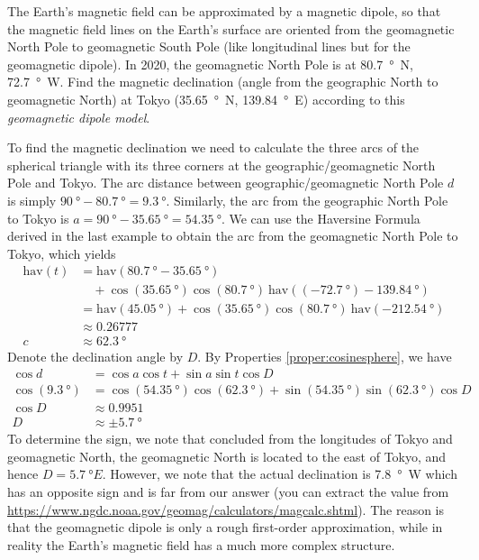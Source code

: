 \begin{exmp}
The Earth's magnetic field can be approximated by a magnetic dipole, so that the magnetic field lines on the Earth's surface are oriented from the geomagnetic North Pole to geomagnetic South Pole (like longitudinal lines but for the geomagnetic dipole). In 2020, the geomagnetic North Pole is at \SI{80.7}{\degree N}, \SI{72.7}{\degree W}. Find the magnetic declination (angle from the geographic North to geomagnetic North) at Tokyo (\SI{35.65}{\degree N}, \SI{139.84}{\degree E}) according to this \textit{geomagnetic dipole model}.
\end{exmp}
\begin{solution}
To find the magnetic declination we need to calculate the three arcs of the spherical triangle with its three corners at the geographic/geomagnetic North Pole and Tokyo. The arc distance between geographic/geomagnetic North Pole $d$ is simply $\SI{90}{\degree} - \SI{80.7}{\degree} = \SI{9.3}{\degree}$. Similarly, the arc from the geographic North Pole to Tokyo is $a = \SI{90}{\degree} - \SI{35.65}{\degree} = \SI{54.35}{\degree}$. We can use the Haversine Formula derived in the last example to obtain the arc from the geomagnetic North Pole to Tokyo, which yields
\begin{align*}
\text{hav}(t) &= \text{hav}(\SI{80.7}{\degree} - \SI{35.65}{\degree}) \\ 
&\quad + \cos(\SI{35.65}{\degree}) \cos(\SI{80.7}{\degree})\ \text{hav}((\SI{-72.7}{\degree}) - \SI{139.84}{\degree}) \\
&= \text{hav}(\SI{45.05}{\degree}) + \cos(\SI{35.65}{\degree}) \cos(\SI{80.7}{\degree})\ \text{hav}(\SI{-212.54}{\degree}) \\
&\approx 0.26777 \\
c &\approx \SI{62.3}{\degree}
\end{align*}
Denote the declination angle by $D$. By Properties \ref{proper:cosinesphere}, we have
\begin{align*}
\cos d &= \cos a \cos t + \sin a \sin t \cos D \\
\cos (\SI{9.3}{\degree}) &= \cos (\SI{54.35}{\degree}) \cos (\SI{62.3}{\degree}) + \sin (\SI{54.35}{\degree}) \sin (\SI{62.3}{\degree}) \cos D \\
\cos D &\approx 0.9951 \\
D &\approx \pm \SI{5.7}{\degree}
\end{align*}
To determine the sign, we note that concluded from the longitudes of Tokyo and geomagnetic North, the geomagnetic North is located to the east of Tokyo, and hence $D = \SI{5.7}{\degree E}$. However, we note that the actual declination is \SI{7.8}{\degree W} which has an opposite sign and is far from our answer (you can extract the value from \href{https://www.ngdc.noaa.gov/geomag/calculators/magcalc.shtml}{https://www.ngdc.noaa.gov/geomag/calculators/magcalc.shtml}). The reason is that the geomagnetic dipole is only a rough first-order approximation, while in reality the Earth's magnetic field has a much more complex structure.
\end{solution}

